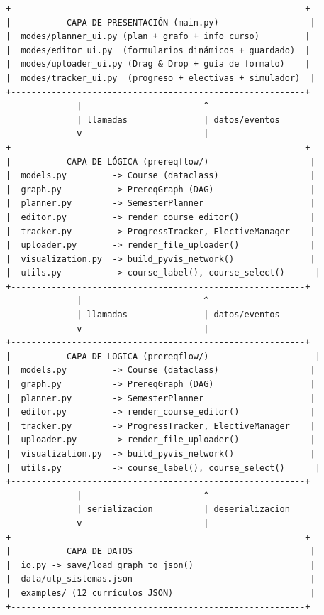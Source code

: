 \documentclass[12pt]{report}
\begin{document}
\begin{verbatim}
+----------------------------------------------------------+
|           CAPA DE PRESENTACIÓN (main.py)                  |
|  modes/planner_ui.py (plan + grafo + info curso)         |
|  modes/editor_ui.py  (formularios dinámicos + guardado)  |
|  modes/uploader_ui.py (Drag & Drop + guía de formato)    |
|  modes/tracker_ui.py  (progreso + electivas + simulador)  |
+----------------------------------------------------------+
              |                        ^
              | llamadas               | datos/eventos
              v                        |
+----------------------------------------------------------+
|           CAPA DE LÓGICA (prereqflow/)                    |
|  models.py         -> Course (dataclass)                  |
|  graph.py          -> PrereqGraph (DAG)                   |
|  planner.py        -> SemesterPlanner                     |
|  editor.py         -> render_course_editor()              |
|  tracker.py        -> ProgressTracker, ElectiveManager    |
|  uploader.py       -> render_file_uploader()              |
|  visualization.py  -> build_pyvis_network()               |
|  utils.py          -> course_label(), course_select()      |
+----------------------------------------------------------+
              |                        ^
              | llamadas               | datos/eventos
              v                        |
+----------------------------------------------------------+
|           CAPA DE LOGICA (prereqflow/)                     |
|  models.py         -> Course (dataclass)                  |
|  graph.py          -> PrereqGraph (DAG)                   |
|  planner.py        -> SemesterPlanner                     |
|  editor.py         -> render_course_editor()              |
|  tracker.py        -> ProgressTracker, ElectiveManager    |
|  uploader.py       -> render_file_uploader()              |
|  visualization.py  -> build_pyvis_network()               |
|  utils.py          -> course_label(), course_select()      |
+----------------------------------------------------------+
              |                        ^
              | serializacion          | deserializacion
              v                        |
+----------------------------------------------------------+
|           CAPA DE DATOS                                   |
|  io.py -> save/load_graph_to_json()                       |
|  data/utp_sistemas.json                                   |
|  examples/ (12 currículos JSON)                           |
+----------------------------------------------------------+
\end{verbatim}
\end{document}
